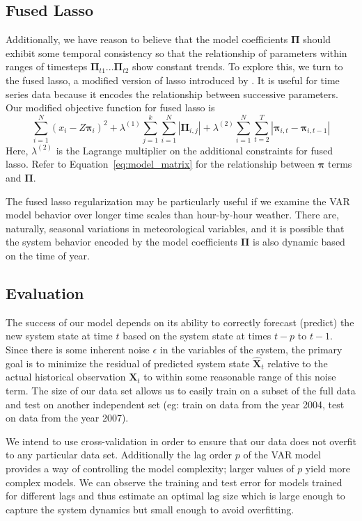 \documentclass{article} %
\newcommand{\bs}{\boldsymbol}
\newcommand{\VARnumVars}{N}
\newcommand{\VARlag}{p}
\newcommand{\VARdata}{\bs{X}}
\newcommand{\VARmodel}{\bs{\Pi}}
\newcommand{\VARmodelrow}{\bs{\pi}}
\newcommand {\VARnoise}{\epsilon}
\newcommand{\predicted}{\hat}
\newcommand{\lassoMult}{\lambda^{(1)}}
\newcommand{\fusedLassoMult}{\lambda^{(2)}}
\begin{document}
\subsection{Fused Lasso}
Additionally, we have reason to believe that the model coefficients $\VARmodel$ should exhibit some temporal consistency so that the relationship of parameters within ranges of timesteps $\VARmodel_{t1} ... \VARmodel_{t2}$ show constant trends. To explore this, we turn to the fused lasso, a modified version of lasso introduced by \cite{Tibshirani2005}. It is useful for time series data because it encodes the relationship between successive parameters. Our modified objective function for fused lasso is 
\begin{equation}
	\sum\limits_{i=1}^\VARnumVars (x_i - Z \VARmodelrow_i)^2  
	+ \lassoMult \sum\limits_{j=1}^k \sum\limits_{i=1}^\VARnumVars | \VARmodel_{i,j} |  
	+ \fusedLassoMult  \sum \limits_{i=1}^\VARnumVars \sum \limits_{t=2}^T | \VARmodelrow_{i,t} - \VARmodelrow_{i,t-1} |
\end{equation}
Here, $\fusedLassoMult$ is the Lagrange multiplier on the additional constraints for fused lasso. Refer to Equation~\ref{eq:model_matrix} for the relationship between $\VARmodelrow$ terms and $\VARmodel$.

The fused lasso regularization may be particularly useful if we examine the VAR model behavior over longer time scales than hour-by-hour weather. There are, naturally, seasonal variations in meteorological variables, and it is possible that the system behavior encoded by the model coefficients $\VARmodel$ is also dynamic based on the time of year.

\subsection{Evaluation}
The success of our model depends on its ability to correctly forecast (predict) the new system state at time $t$ based on the system state at times $t-\VARlag$ to $t-1$. Since there is some inherent noise $\VARnoise$ in the variables of the system, the primary goal is to minimize the residual of predicted system state $\predicted{\VARdata}_t$ relative to the actual historical observation $\VARdata_t$ to within some reasonable range of this noise term.  The size of our data set allows us to easily train on a subset of the full data and test on another independent set (eg: train on data from the year 2004, test on data from the year 2007).

We intend to use cross-validation in order to ensure that our data does not overfit to any particular data set. Additionally the lag order $\VARlag$ of the VAR model provides a way of controlling the model complexity; larger values of $\VARlag$ yield more complex models. We can observe the training and test error for models trained for different lags and thus estimate an optimal lag size which is large enough to capture the system dynamics but small enough to avoid overfitting.
\end{document}

